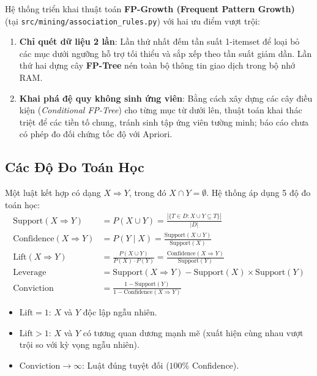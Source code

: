 Hệ thống triển khai thuật toán \textbf{FP-Growth (Frequent Pattern Growth)}~\cite{han2000mining} (tại \texttt{src/mining/association\_rules.py}) với hai ưu điểm vượt trội:
\begin{enumerate}[label=\arabic*.]
  \item \textbf{Chỉ quét dữ liệu 2 lần}: Lần thứ nhất đếm tần suất 1-itemset để loại bỏ các mục dưới ngưỡng hỗ trợ tối thiểu và sắp xếp theo tần suất giảm dần. Lần thứ hai dựng cây \textbf{FP-Tree} nén toàn bộ thông tin giao dịch trong bộ nhớ RAM.
  \item \textbf{Khai phá đệ quy không sinh ứng viên}: Bằng cách xây dựng các cây điều kiện (\textit{Conditional FP-Tree}) cho từng mục từ dưới lên, thuật toán khai thác triệt để các tiền tố chung, tránh sinh tập ứng viên tường minh; báo cáo chưa có phép đo đối chứng tốc độ với Apriori.
\end{enumerate}

\subsection{Các Độ Đo Toán Học}
Một luật kết hợp có dạng $X \Rightarrow Y$, trong đó $X \cap Y = \emptyset$. Hệ thống áp dụng 5 độ đo toán học:
\begin{align}
  \text{Support}(X \Rightarrow Y) &= P(X \cup Y) = \frac{|\{T \in D : X \cup Y \subseteq T\}|}{|D|} \\
  \text{Confidence}(X \Rightarrow Y) &= P(Y \mid X) = \frac{\text{Support}(X \cup Y)}{\text{Support}(X)} \\
  \text{Lift}(X \Rightarrow Y) &= \frac{P(X \cup Y)}{P(X) \cdot P(Y)} = \frac{\text{Confidence}(X \Rightarrow Y)}{\text{Support}(Y)} \\
  \text{Leverage} &= \text{Support}(X \Rightarrow Y) - \text{Support}(X) \times \text{Support}(Y) \\
  \text{Conviction} &= \frac{1 - \text{Support}(Y)}{1 - \text{Confidence}(X \Rightarrow Y)}
\end{align}

\begin{itemize}
  \item $\text{Lift} = 1$: $X$ và $Y$ độc lập ngẫu nhiên.
  \item $\text{Lift} > 1$: $X$ và $Y$ có tương quan dương mạnh mẽ (xuất hiện cùng nhau vượt trội so với kỳ vọng ngẫu nhiên).
  \item $\text{Conviction} \to \infty$: Luật đúng tuyệt đối ($100\%$ Confidence).
\end{itemize}

